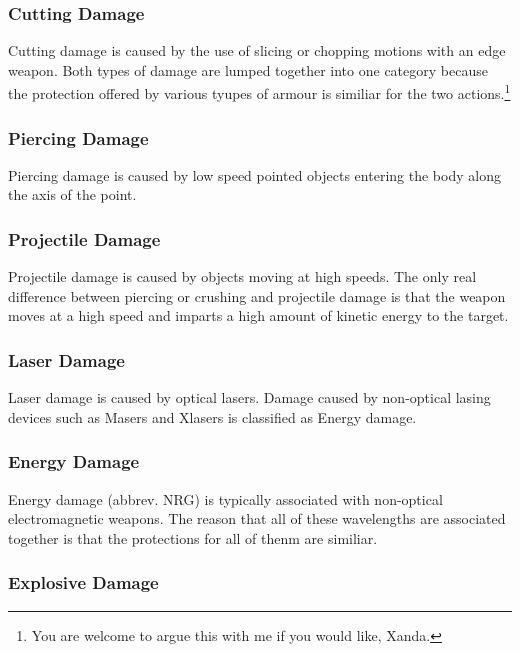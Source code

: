 \subsubsection{Cutting Damage}

Cutting damage is caused by the use of slicing or chopping motions 
with an edge weapon. Both types of damage are lumped together into 
one category because the protection offered by various tyupes of 
armour is similiar for the two actions.\footnote{You are welcome 
to argue this with me if you would like,  Xanda.}

\subsubsection{Piercing Damage}

Piercing damage is caused by low speed pointed objects entering the 
body along the axis of the point. 

\subsubsection{Projectile Damage}

Projectile damage is caused by objects moving at high speeds. The 
only real difference between piercing or crushing and projectile 
damage is that the weapon moves at a high speed and imparts a
high amount of kinetic energy to the target.

\subsubsection{Laser Damage}

Laser damage is caused by optical lasers. Damage caused by 
non-optical lasing devices such as Masers and Xlasers is classified 
as Energy damage. 

\subsubsection{Energy Damage}

Energy damage (abbrev. NRG) is typically associated with non-optical 
electromagnetic weapons. The reason that all of these wavelengths are 
associated together is that the protections for all of thenm are 
similiar.          

\subsubsection{Explosive Damage}

